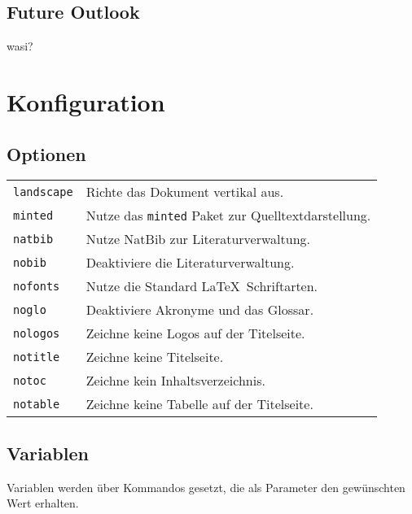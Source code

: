 \subsection{Future Outlook}
wasi?








\section{Konfiguration}
\subsection{Optionen}
\begin{tabularx}{\textwidth}{l X}
{\small \verb|landscape|}    & Richte das Dokument vertikal aus.\\
{\small \verb|minted|}       & Nutze das \texttt{minted} Paket zur Quelltextdarstellung.\\
{\small \verb|natbib|}       & Nutze NatBib zur Literaturverwaltung.\\
{\small \verb|nobib|}        & Deaktiviere die Literaturverwaltung.\\
{\small \verb|nofonts|}      & Nutze die Standard \LaTeX ~Schriftarten.\\
{\small \verb|noglo|}        & Deaktiviere Akronyme und das Glossar.\\
{\small \verb|nologos|}      & Zeichne keine Logos auf der Titelseite.\\
{\small \verb|notitle|}      & Zeichne keine Titelseite.\\
{\small \verb|notoc|}        & Zeichne kein Inhaltsverzeichnis.\\
{\small \verb|notable|}      & Zeichne keine Tabelle auf der Titelseite.
\end{tabularx}

\subsection{Variablen}
Variablen werden über Kommandos gesetzt, die als Parameter den gewünschten Wert erhalten.
\begin{center}
    \ifminted   {}
    \else       {}\fi
\end{center}

